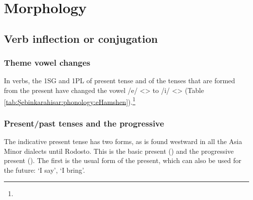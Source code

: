 \section{Morphology}
\subsection{Verb inflection or conjugation}
\subsubsection{Theme vowel changes}
In verbs, the 1SG and 1PL of present tense and of the tenses that are formed from the present have changed the vowel /e/ <> to /i/ <> (Table \ref{tab:Şebinkarahisar:phonology:eHamshen}).\footnote{}


\begin{table}[H]
	\centering 
	\caption{Change from theme vowel /e/ <> to /i/ <> in the Şebinkarahisar dialect}
	\label{tab:Şebinkarahisar:phonology:eHamshen}
\end{table}

\subsubsection{Present/past tenses and the progressive}

The indicative present tense has two forms, as is found westward in all the Asia Minor dialects until Rodosto. This is the basic present () and the progressive present (). The first is the usual form of the present, which can also be used for the future: `I say', `I bring'.


